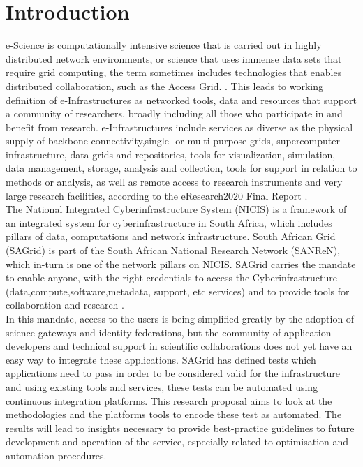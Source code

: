 \documentclass [titlepage,11pt]{article}
\begin{document}
\section{Introduction}

e-Science  is computationally intensive science that is carried out in highly distributed network environments, or science that uses immense data sets that require grid computing, the term sometimes includes technologies that enables distributed collaboration, such as the Access Grid. \citep{escience}. This leads to working definition of e-Infrastructures as networked tools, data and resources that support a community of researchers, broadly including all those who participate in and benefit from research. e-Infrastructures include services as diverse as the physical supply of backbone connectivity,single- or multi-purpose grids, supercomputer infrastructure, data grids and repositories, tools for visualization, simulation, data management, storage, analysis and collection, tools for
support in relation to methods or analysis, as well as remote access to research instruments and very large research facilities, according to the eResearch2020 Final Report \citep{eresearch}.\\ 

The National Integrated Cyberinfrastructure System (NICIS) is a framework of an integrated system for cyberinfrastructure in South Africa, which includes pillars of data, computations and network infrastructure. South African Grid (SAGrid) is part of the South African National Research Network (SANReN), which in-turn is one of the network pillars on NICIS. SAGrid carries the mandate to enable anyone, with the right credentials to access the Cyberinfrastructure (data,compute,software,metadata, support, etc services) and to provide tools for collaboration and research \citep{nicis}. \\

In this mandate, access to the users is being simplified greatly by the adoption of science gateways and identity federations, but the community of application developers and technical support in scientific collaborations does not yet have an easy way to integrate these applications. SAGrid has defined tests which applications need to pass in order to be considered valid for the infrastructure and using existing tools and services, these tests can be automated using continuous integration platforms. This research proposal aims to look at the methodologies and the platforms tools to encode these test as automated. The results will lead to insights necessary to provide best-practice guidelines to future development and operation of the service, especially related to optimisation and automation procedures.\\
\end{document}
